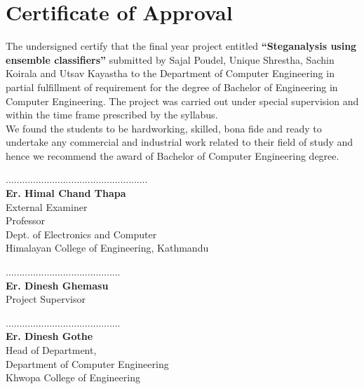 \titleformat{\chapter}[display]{\normalfont\huge\bfseries\centering}{\chaptertitlename\ \thechapter}{20pt}{\Huge}

\chapter*{ Certificate of Approval}
\normalsize
\vspace{1cm}
The undersigned certify that the final year project entitled \textbf{“Steganalysis using ensemble classifiers”} submitted by Sajal Poudel, Unique Shrestha,
Sachin Koirala and Utsav Kayastha to the Department of Computer Engineering in partial fulfillment of requirement for
the degree of Bachelor of Engineering in Computer Engineering. The project was
carried out under special supervision and within the time frame prescribed by the
syllabus.
\\
We found the students to be hardworking, skilled, bona fide and ready to undertake any
commercial and industrial work related to their field of study and hence we recommend
the award of Bachelor of Computer Engineering degree.\\ 
\vspace{1in}
\begin{multicols}{2}
	\begin{center}
		....................................................\\
		\textbf{Er. Himal Chand Thapa }\\
		External Examiner\\
		Professor\\ 		
		Dept. of Electronics and Computer\\
		Himalayan College of Engineering, Kathmandu\\
		
	\end{center}
\columnbreak
	\begin{center}
		..........................................\\
		\textbf{Er. Dinesh Ghemasu}\\
		Project Supervisor\\

		
	\end{center}
\end{multicols}

\vspace{1in}
\begin{center}
	..........................................\\
	\textbf{Er. Dinesh Gothe}\\
	Head of Department,\\
	Department of Computer Engineering\\
	Khwopa College of Engineering
\end{center}
\pagebreak




